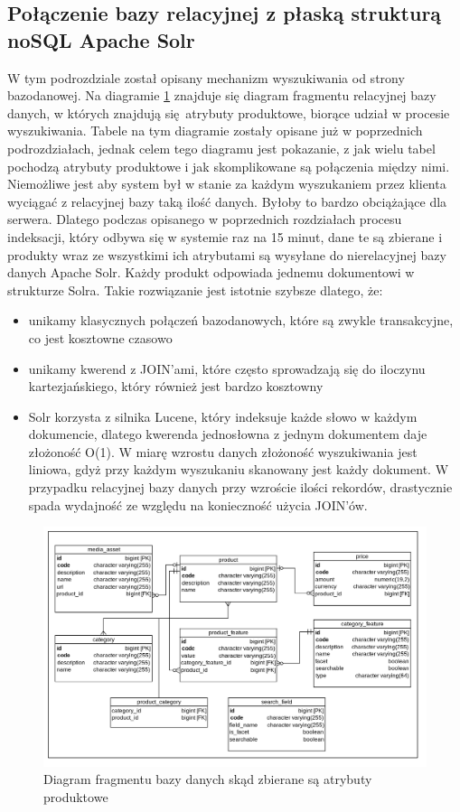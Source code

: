 \subsection{Połączenie bazy relacyjnej z płaską strukturą noSQL Apache Solr}
W tym podrozdziale został opisany mechanizm wyszukiwania od strony bazodanowej. Na diagramie \ref{db_wyszukiwarka} znajduje się diagram fragmentu relacyjnej bazy danych, w których znajdują się atrybuty produktowe, biorące udział w procesie wyszukiwania. Tabele na tym diagramie zostały opisane już w poprzednich podrozdziałach, jednak celem tego diagramu jest pokazanie, z jak wielu tabel pochodzą atrybuty produktowe i jak skomplikowane są połączenia między nimi. Niemożliwe jest aby system był w stanie za każdym wyszukaniem przez klienta wyciągać z relacyjnej bazy taką ilość danych. Byłoby to bardzo obciążające dla serwera. Dlatego podczas opisanego w poprzednich rozdziałach procesu indeksacji, który odbywa się w systemie raz na 15 minut, dane te są zbierane i produkty wraz ze wszystkimi ich atrybutami są wysyłane do nierelacyjnej bazy danych Apache Solr. Każdy produkt odpowiada jednemu dokumentowi w strukturze Solra. Takie rozwiązanie jest istotnie szybsze dlatego, że:
\begin{itemize}
	\item unikamy klasycznych połączeń bazodanowych, które są zwykle transakcyjne, co jest kosztowne czasowo
	\item unikamy kwerend z JOIN'ami, które często sprowadzają się do iloczynu kartezjańskiego, który również jest bardzo kosztowny
	\item Solr korzysta z silnika Lucene, który indeksuje każde słowo w każdym dokumencie, dlatego kwerenda jednosłowna z jednym dokumentem daje złożoność O(1). W miarę wzrostu danych złożoność wyszukiwania jest liniowa, gdyż przy każdym wyszukaniu skanowany jest każdy dokument. W przypadku relacyjnej bazy danych przy wzroście ilości rekordów, drastycznie spada wydajność ze względu na konieczność użycia JOIN'ów.
\end{itemize}
 
\begin{figure}
	\begin{center}
		\includegraphics[scale=0.25]{db_wyszukiwarka.png}
	\end{center}
	\caption{{\color{black}Diagram fragmentu bazy danych skąd zbierane są atrybuty produktowe}} \label{db_wyszukiwarka}
\end{figure}


